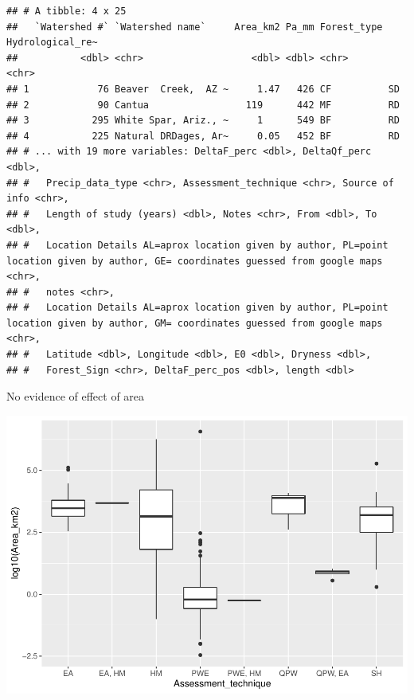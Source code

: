 \documentclass[]{elsarticle} %
\newenvironment{Shaded}{\begin{snugshade}}{\end{snugshade}}
\newcommand{\KeywordTok}[1]{\textcolor[rgb]{0.13,0.29,0.53}{\textbf{#1}}}
\newcommand{\NormalTok}[1]{#1}
\newcommand{\OperatorTok}[1]{\textcolor[rgb]{0.81,0.36,0.00}{\textbf{#1}}}
\newcommand{\StringTok}[1]{\textcolor[rgb]{0.31,0.60,0.02}{#1}}
\begin{document}
\begin{verbatim}
## # A tibble: 4 x 25
##   `Watershed #` `Watershed name`     Area_km2 Pa_mm Forest_type Hydrological_re~
##           <dbl> <chr>                   <dbl> <dbl> <chr>       <chr>           
## 1            76 Beaver  Creek,  AZ ~     1.47   426 CF          SD              
## 2            90 Cantua                 119      442 MF          RD              
## 3           295 White Spar, Ariz., ~     1      549 BF          RD              
## 4           225 Natural DRDages, Ar~     0.05   452 BF          RD              
## # ... with 19 more variables: DeltaF_perc <dbl>, DeltaQf_perc <dbl>,
## #   Precip_data_type <chr>, Assessment_technique <chr>, Source of info <chr>,
## #   Length of study (years) <dbl>, Notes <chr>, From <dbl>, To <dbl>,
## #   Location Details AL=aprox location given by author, PL=point location given by author, GE= coordinates guessed from google maps <chr>,
## #   notes <chr>,
## #   Location Details AL=aprox location given by author, PL=point location given by author, GM= coordinates guessed from google maps <chr>,
## #   Latitude <dbl>, Longitude <dbl>, E0 <dbl>, Dryness <dbl>,
## #   Forest_Sign <chr>, DeltaF_perc_pos <dbl>, length <dbl>
\end{verbatim}

No evidence of effect of area

\begin{Shaded}
\end{Shaded}

\includegraphics{Forest_and_Water_files/figure-latex/unnamed-chunk-17-1.pdf}
\end{document}
